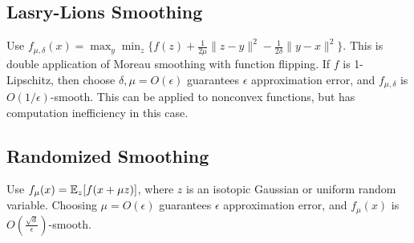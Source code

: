 \subsection{Lasry-Lions Smoothing}

Use $f_{\mu,\delta}(x) = \max_y \min_z \{f(z) + \frac{1}{2\mu}\|z-y\|^2 - \frac{1}{2\delta} \|y-x\|^2\}$. This is double application of Moreau smoothing with function flipping. If $f$ is 1-Lipschitz, then choose $\delta,\mu = O(\epsilon)$ guarantees $\epsilon$ approximation error, and $f_{\mu,\delta}$ is $O(1/\epsilon)$-smooth. This can be applied to nonconvex functions, but has computation inefficiency in this case. 

\subsection{Randomized Smoothing}

Use $f_\mu(x) = \mathbb{E}_z[f(x + \mu z)]$, where $z$ is an isotopic Gaussian or uniform random variable. Choosing $\mu = O(\epsilon)$ guarantees $\epsilon$ approximation error, and $f_\mu(x)$ is $O(\frac{\sqrt{d}}{\epsilon})$-smooth.